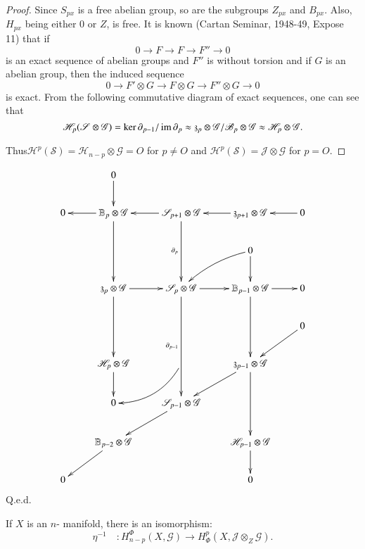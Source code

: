 \begin{proof}
Since $S_{px}$ is a free abelian group, so are the subgroups $Z_{px}$
and $B_{px}$. Also, $H_{px}$ being either 0 or $Z$, is free. It is
known (Cartan Seminar, 1948-49, Expose 11) that if  
$$
0 \rightarrow F \rightarrow F \rightarrow F'' \rightarrow 0 
$$
is an exact sequence of abelian groups and $F''$ is without torsion and
if $G$ is an abelian group, then the induced sequence 
$$
0 \rightarrow F' \otimes G \rightarrow F \otimes G \rightarrow F''
\otimes  G \rightarrow 0 
$$ 
is exact. From the following commutative diagram of exact sequences,
one can see that 
$$
\mathscr{H}_p (\mathscr{S} \otimes \mathscr{G}) = \ker
\partial_{p-1}/\operatorname{im} \partial_p \approx \mathfrak{z}_p \otimes
\mathscr{G} / \mathscr{B}_p \otimes \mathscr{G} \approx \mathscr{H}_p
\otimes \mathscr{G}. 
$$

Thus\pageoriginale $\mathscr{H}^p (\mathscr{S})=\mathscr{H}_{n-p}\otimes
\mathscr{G}=O$ for $p \neq O$ and
$\mathscr{H}^p(\mathscr{S})=\mathcal{J} \otimes \mathscr{G}$ for
$p=O$. 
\end{proof}
\[
\xymatrix{
& 0\ar[d] & & & \\
0 & \mathbb{B}_p\otimes \mathscr{G} \ar[dd] \ar[l]& \mathscr{S}_{p+1} \otimes
\mathscr{G} \ar[dd]_{\partial_p} \ar[l] & \mathfrak{z}_{p+1}\otimes
\mathscr{G} \ar[l]& 0\ar[l]\\
& & & 0 \ar[d]\ar@/_/[dl]&  \\
& \mathfrak{z}_p\otimes \mathscr{G} \ar[r]\ar[dd] &
\mathscr{S}_p\otimes \mathscr{G} \ar[r] \ar[ddd]_{\partial_{p-1}} &
\mathbb{B}_{p-1} 
\otimes \mathscr{G} \ar[r]\ar[dd] & 0 \\
& & & & 0 \ar[dl]\\
& \mathscr{H}_p \otimes \mathscr{G} \ar[d] & \ar@/^1pc/[dl] & \mathfrak{z}_{p-1}
\otimes \mathscr{G}\ar[dd] \ar[dl] &  \\
& 0 & \mathscr{S}_{p-1} \otimes \mathscr{G} \ar[dl] & & \\
& \mathbb{B}_{p-2} \otimes \mathscr{G} \ar[dl] & & \mathscr{H}_{p-1}
\otimes \mathscr{G} \ar[d]& \\
0 & & & 0 & 
}
\]
\hfill{Q.e.d.}

\begin{proposition}%
If $X$ is an $n$- manifold, there is an isomorphism: 
$$
\eta^{-1} \quad : H^\Phi_{n-p}(X,\mathscr{G}) \to H^p_\Phi (X,
\mathcal{J} \otimes_Z \mathscr{G}). 
$$
\end{proposition}

